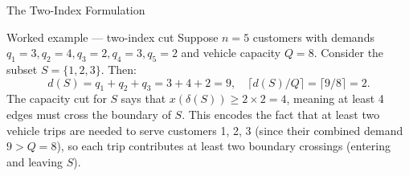 \documentclass[aspectratio=169,10pt]{beamer}
\begin{document}
\begin{frame}[allowframebreaks]{The Two-Index Formulation}
\framebreak

\begin{exampleblock}{Worked example --- two-index cut}
Suppose $n = 5$ customers with demands $q_1 = 3, q_2 = 4, q_3 = 2,
q_4 = 3, q_5 = 2$ and vehicle capacity $Q = 8$. Consider the subset
$S = \{1, 2, 3\}$. Then:
\[
  d(S) = q_1 + q_2 + q_3 = 3 + 4 + 2 = 9, \quad
  \Big\lceil d(S)/Q \Big\rceil = \lceil 9/8 \rceil = 2.
\]
The capacity cut for $S$ says that $x(\delta(S)) \geq 2 \times 2 = 4$,
meaning at least 4 edges must cross the boundary of $S$. This encodes the
fact that at least two vehicle trips are needed to serve customers 1, 2, 3
(since their combined demand $9 > Q = 8$), so each trip contributes at
least two boundary crossings (entering and leaving $S$).
\end{exampleblock}

\end{frame}
\end{document}
